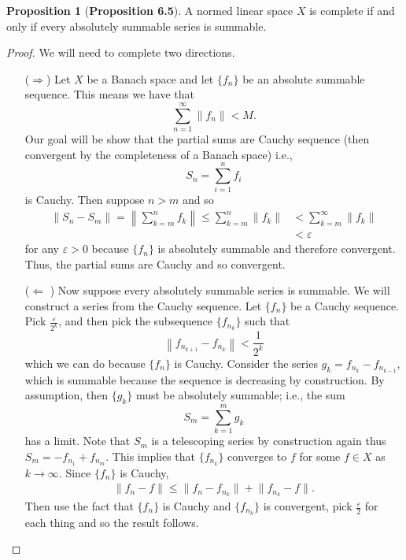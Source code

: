 \documentclass[12pt]{article}
\renewcommand{\epsilon}{\varepsilon}
\theoremstyle{definition}
\newtheorem*{prop}{Proposition}
\begin{document}
\begin{prop}[\textbf{Proposition 6.5}]

    A normed linear space \( X \) is complete if and only if every absolutely summable series is summable.

    \begin{proof}
        We will need to complete two directions.
            \begin{enumerate}
                \item[(\(\Rightarrow\))] Let \( X \) be a Banach space and let \( \{f_n \} \) be an absolute summable sequence. This means we have that
                    \[
                        \sum_{n=1}^{\infty} \lVert f_n \rVert < M.
                    \]
                Our goal will be show that the partial sums are Cauchy sequence (then convergent by the completeness of a Banach space) i.e.,
                    \[
                        S_n =  \sum_{i=1}^{n}f_i  
                    \]
                is Cauchy. Then suppose \( n > m \) and so
                    \begin{align*}
                        \lVert S_n - S_m \rVert = \left\lVert \sum_{k=m}^{n} f_k \right\rVert \leq \sum_{k=m}^{n} \lVert f_k \rVert &< \sum_{k=m}^{\infty} \lVert f_k \rVert  \\
                        &< \epsilon
                    \end{align*}
                for any \( \epsilon > 0 \) because \( \{f_n\} \) is absolutely summable and therefore convergent. Thus, the partial sums are Cauchy and so convergent.
                \item[(\( \Leftarrow\) )] Now suppose every absolutely summable series is summable. We will construct a series from the Cauchy sequence. Let \( \{ f_n\} \) be a Cauchy sequence. Pick \( \displaystyle \frac{\epsilon}{2^{k}} \), and then pick the subsequence \( \{f_{n_{k}} \} \) such that 
                    \[
                        \left\lVert f_{n_{k+1}} - f_{n_{k}} \right\rVert < \frac{1}{2^{k}} 
                    \]
                which we can do because \( \{f_n\}\) is Cauchy.
                Consider the series \( g_k = f_{n_{k}} - f_{n_{k-1}} \), which is summable because the sequence is decreasing by construction. By assumption, then \( \{g_k\}\) must be absolutely summable; i.e., the sum
                    \[
                        S_m = \sum_{k=1}^{m} g_k  
                    \]
                has a limit. Note that \( S_m \) is a telescoping series by construction again thus \( S_m = -f_{n_{1}} + f_{n_{m}} \). This implies that \( \{f_{n_{k}} \} \) converges to \( f \) for some \( f \in X \) as \( k \to \infty \). Since \( \{f_n\} \) is Cauchy,
                    \begin{align*}
                        \left\lVert f_n - f \right\rVert \leq \lVert f_n - f_{n_{k}} \rVert + \lVert f_{n_{k}} - f \rVert.
                    \end{align*}
                Then use the fact that \( \{f_n\} \) is Cauchy and \( \{f_{n_{k}}\}\) is convergent, pick \( \displaystyle \frac{\epsilon}{2} \) for each thing and so the result follows.
                

\end{enumerate}
\end{proof}
\end{prop}
\end{document}
